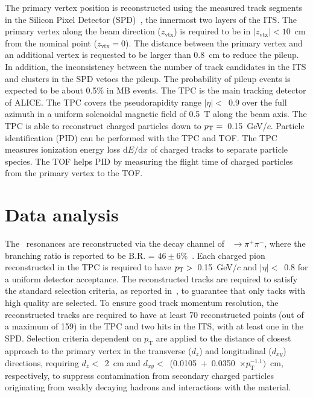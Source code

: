 The primary vertex position is reconstructed using the measured track segments in the Silicon Pixel Detector (SPD)~\cite{Santoro2009:ALICESPD}, the innermost two layers of the ITS. The primary vertex along the beam direction ($z_\mathrm{vtx}$) is required to be in $|z_\mathrm{vtx}|<10$~cm from the nominal point ($z_\mathrm{vtx}=0$). The distance between the primary vertex and an additional vertex is requested to be larger than 0.8~cm to reduce the pileup. In addition, the inconsistency between the number of track candidates in the ITS and clusters in the SPD vetoes the pileup. The probability of pileup events is expected to be about 0.5\% in MB events. The TPC is the main tracking detector of ALICE. The TPC covers the pseudorapidity range $|\eta|<$~0.9 over the full azimuth in a uniform solenoidal magnetic field of 0.5~T along the beam axis. The TPC is able to reconstruct charged particles down to $p_{\rm{T}}=$~0.15~GeV/$c$. Particle identification (PID) can be performed with the TPC and TOF. The TPC measures ionization energy loss $\mathrm{d}E/\mathrm{d}x$ of charged tracks to separate particle species. The TOF helps PID by measuring the flight time of charged particles from the primary vertex to the TOF.

\section{Data analysis}

The \fzero~resonances are reconstructed via the decay channel of \fzero~$\rightarrow \pi^{+}\pi^{-}$, where the branching ratio is reported to be B.R. = $46\pm6$\%~\cite{Stone:2013eaa}. Each charged pion reconstructed in the TPC is required to have $p_{\rm{T}}>$~0.15~GeV/$c$ and $|\eta|<$~0.8 for a uniform detector acceptance. The reconstructed tracks are required to satisfy the standard selection criteria, as reported in~\cite{ALICE:2022qnb}, to guarantee that only tacks with high quality are selected. To ensure good track momentum resolution, the reconstructed tracks are required to have at least 70 reconstructed points (out of a maximum of 159) in the TPC and two hits in the ITS, with at least one in the SPD. Selection criteria dependent on $p_{\mathrm{T}}$ are applied to the distance of closest approach to the primary vertex in the transverse ($d_{z}$) and longitudinal ($d_{xy}$) directions, requiring $d_{z}<$~2~cm and $d_{xy}<$~(0.0105~$+$~0.0350~$\times p_{\mathrm{T}}^{-1.1})$~cm, respectively, to suppress contamination from secondary charged particles originating from weakly decaying hadrons and interactions with the material.

